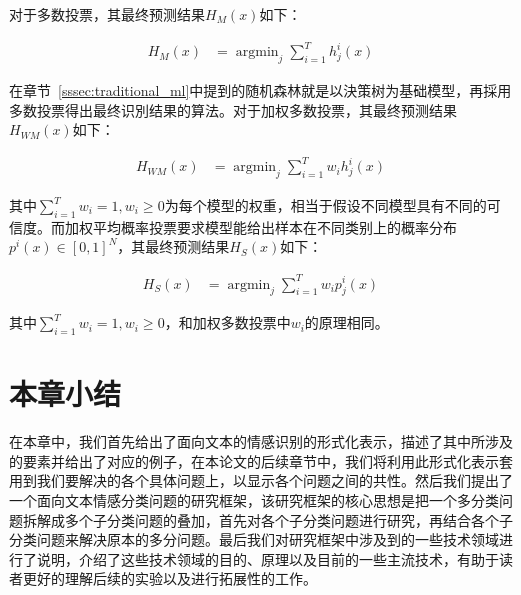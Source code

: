 对于多数投票，其最终预测结果$H_M(x)$如下：

\begin{align}
  H_{M}(x) &= \mathop{\arg\min}_{j} \sum\limits_{i=1}^{T}h^i_j(x)
\end{align}

在章节~\ref{sssec:traditional_ml}中提到的随机森林就是以決策树为基础模型，再採用多数投票得出最终识別结果的算法。对于加权多数投票，其最终预测结果$H_{WM}(x)$如下：

\begin{align}
  H_{WM}(x) &= \mathop{\arg\min}_{j} \sum\limits_{i=1}^{T}w_i h^i_j(x)
\end{align}

其中$\sum\limits_{i=1}^{T}w_i = 1, w_i \geq 0$为每个模型的权重，相当于假设不同模型具有不同的可信度。而加权平均概率投票要求模型能给出样本在不同类别上的概率分布$p^i(x) \in [0, 1]^N$，其最终预测结果$H_S(x)$如下：

\begin{align}
  H_{S}(x) &= \mathop{\arg\min}_{j} \sum\limits_{i=1}^{T}w_i p^i_j(x)
\end{align}

其中$\sum\limits_{i=1}^{T}w_i = 1, w_i \geq 0$，和加权多数投票中$w_i$的原理相同。

\section{本章小结}

在本章中，我们首先给出了面向文本的情感识别的形式化表示，描述了其中所涉及的要素并给出了对应的例子，在本论文的后续章节中，我们将利用此形式化表示套用到我们要解决的各个具体问题上，以显示各个问题之间的共性。然后我们提出了一个面向文本情感分类问题的研究框架，该研究框架的核心思想是把一个多分类问题拆解成多个子分类问题的叠加，首先对各个子分类问题进行研究，再结合各个子分类问题来解决原本的多分问题。最后我们对研究框架中涉及到的一些技术领域进行了说明，介绍了这些技术领域的目的、原理以及目前的一些主流技术，有助于读者更好的理解后续的实验以及进行拓展性的工作。












